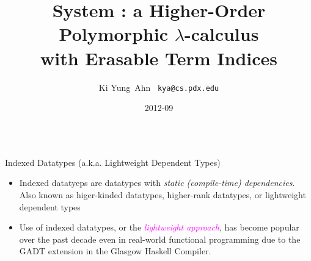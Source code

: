 \documentclass[final]{beamer}
\title[Fancy Posters]{{\VERYHuge System \Fi} {\Huge :}
		{\huge a Higher-Order Polymorphic $\lambda$-calculus} \\
		{\huge with Erasable Term Indices}
  }
\author[Ki Yung Ahn]{ Ki Yung $\,$Ahn $\,$ {\Large\texttt{kya@cs.pdx.edu}} }
\institute[Portland State University]{
	Department of Computer Science, Portland State University }
\date{2012-09}
\begin{document}
\begin{frame}[fragile]
\begin{columns}[t]

\begin{column}{.315\linewidth}

\begin{block}{Indexed Datatypes
	{\normalsize({\small a.k.a. }Lightweight Dependent Types)} }
\begin{itemize}
\item Indexed datatyeps are datatypes
	with \emph{static (compile-time) dependencies}.
	Also known as higer-kinded datatypes, higher-rank datatypes,
	or lightweight dependent types
\item Use of indexed datatypes, or the \textcolor{magenta}{\emph{lightweight approach}},
	has become popular
	over the past decade even in real-world functional programming due to
	the GADT extension in the Glasgow Haskell Compiler.
\end{itemize}
\end{block}


\end{column}
\end{columns}
\end{frame}
\end{document}
